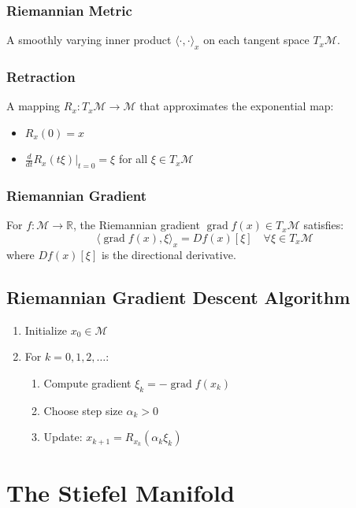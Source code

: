 \documentclass[11pt]{article}
\begin{document}
\subsubsection{Riemannian Metric}
A smoothly varying inner product $\langle \cdot, \cdot \rangle_x$ on each tangent space $T_x\mathcal{M}$.

\subsubsection{Retraction}
A mapping $R_x: T_x\mathcal{M} \to \mathcal{M}$ that approximates the exponential map:
\begin{itemize}
    \item $R_x(0) = x$
    \item $\frac{d}{dt} R_x(t\xi)\big|_{t=0} = \xi$ for all $\xi \in T_x\mathcal{M}$
\end{itemize}

\subsubsection{Riemannian Gradient}
For $f: \mathcal{M} \to \mathbb{R}$, the Riemannian gradient $\operatorname{grad} f(x) \in T_x\mathcal{M}$ satisfies:
\[
\langle \operatorname{grad} f(x), \xi \rangle_x = D f(x)[\xi] \quad \forall \xi \in T_x\mathcal{M}
\]
where $D f(x)[\xi]$ is the directional derivative.

\subsection{Riemannian Gradient Descent Algorithm}
\begin{enumerate}
    \item Initialize $x_0 \in \mathcal{M}$
    \item For $k = 0, 1, 2, \dots$:
    \begin{enumerate}
        \item Compute gradient $\xi_k = -\operatorname{grad} f(x_k)$
        \item Choose step size $\alpha_k > 0$
        \item Update: $x_{k+1} = R_{x_k}(\alpha_k \xi_k)$
    \end{enumerate}
\end{enumerate}

\section{The Stiefel Manifold}
\end{document}
